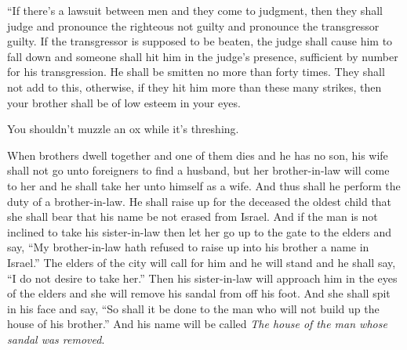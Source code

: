 
\begin{inparaenum}
   ``If there's a lawsuit between men and they come to judgment, then they shall judge and pronounce the righteous not guilty and pronounce the transgressor guilty.%
   If the transgressor is supposed to be beaten, the judge shall cause him to fall down and someone shall hit him in the judge's presence, sufficient by number for his transgression.%
   He shall be smitten no more than forty times. They shall not add to this, otherwise, if they hit him more than these many strikes, then your brother shall be of low esteem in your eyes.%

   You shouldn't muzzle an ox while it's threshing.%

   When brothers dwell together and one of them dies and he has no son, his wife shall not go unto foreigners to find a husband, but her brother-in-law will come to her and he shall take her unto himself as a wife. And thus shall he perform the duty of a brother-in-law.%
   He shall raise up for the deceased the oldest child that she shall bear that his name be not erased from Israel.%
   And if the man is not inclined to take his sister-in-law then let her go up to the gate to the elders and say, ``My brother-in-law hath refused to raise up into his brother a name in Israel.''%
   The elders of the city will call for him and he will stand and he shall say, ``I do not desire to take her.''%
   Then his sister-in-law will approach him in the eyes of the elders and she will remove his sandal from off his foot. And she shall spit in his face and say, ``So shall it be done to the man who will not build up the house of his brother.''%
   And his name will be called \textit{The house of the man whose sandal was removed}.%


\end{inparaenum}
